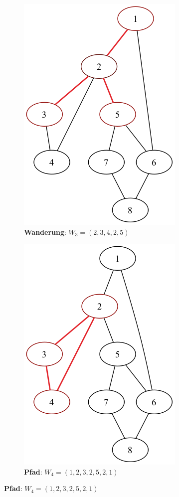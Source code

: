 \documentclass[a4paper,11pt]{report}
\begin{document}
\begin{figure}[htbp]
    \vspace{1em}

    \begin{subfigure}[b]{0.45\textwidth}
        \includegraphics[height=0.25\textheight]{notebook/assets/aufgabe_03_walk_3.png}
        \caption{\textbf{Wanderung}: $W_3 = (2, 3, 4, 2, 5)$}
        \label{fig:w_3}
    \end{subfigure}
    \hfill
    \begin{subfigure}[b]{0.45\textwidth}
        \includegraphics[height=0.25\textheight]{notebook/assets/aufgabe_03_walk_4.png}
        \caption{\textbf{Pfad}: $W_4 = (1, 2, 3, 2, 5, 2, 1)$}
        \label{fig:w_4}
    \end{subfigure}
    \hfill


\end{figure}
\end{document}
